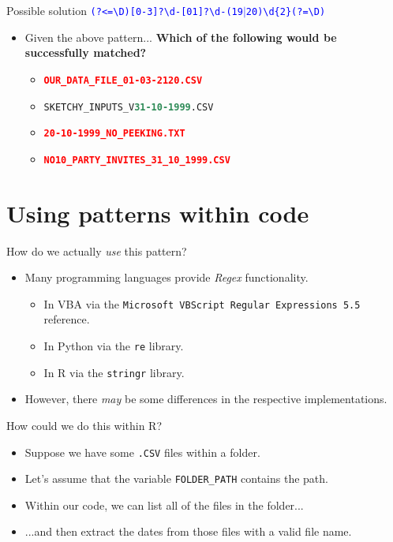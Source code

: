 \documentclass[
	usenames,
	dvipsnames,
] {beamer}
\newcommand{\reDigit}{\textbackslash{}d}
\newcommand{\reNonDigit}{\textbackslash{}D}
\newcommand{\rePattern}[1]{{\Large\texttt{\textcolor{blue}{#1}}}}
\begin{document}
\begin{frame}{Possible solution}
	\rePattern{(?\textless=\reNonDigit)[0-3]?\reDigit-[01]?\reDigit-(19$|$20)\reDigit\{2\}(?=\reNonDigit)}
	\medskip
	
	\begin{itemize}[label=\textbullet]
		\item Given the above pattern... \textbf{Which of the following would be successfully matched?}
		      \begin{itemize}[label=\textendash]
				\item<2-> \texttt{\textbf<3->{\textcolor<3->{red}{OUR\_DATA\_FILE\_01-03-2120.CSV}}}
			      	\item<4-> \texttt{SKETCHY\_INPUTS\_V\textbf<5->{\textcolor<5->{SeaGreen}{31-10-1999}}.CSV}
			      	\item<6-> \texttt{\textbf<7->{\textcolor<7->{red}{20-10-1999\_NO\_PEEKING.TXT}}}
			      	\item<8-> \texttt{\textbf<9->{\textcolor<9->{red}{NO10\_PARTY\_INVITES\_31\_10\_1999.CSV}}}
		      \end{itemize}
	\end{itemize}
\end{frame}

\section{Using patterns within code}
\begin{frame}{How do we actually \emph{use} this pattern?}
	\begin{itemize}[label=\textbullet]
		\item Many programming languages provide \emph{Regex} functionality.
			\pause
		\begin{itemize}[label=\textendash]
			\item In VBA via the \texttt{Microsoft VBScript Regular Expressions 5.5} reference.
				\pause
			\item In Python via the \texttt{re} library.
				\pause
			\item In R via the \texttt{stringr} library.
				\pause
		\end{itemize}			
			
		\item However, there \emph{may} be some differences in the respective implementations.
	\end{itemize}
\end{frame}

\begin{frame}{How could we do this within R?}
	\begin{itemize}[label=\textbullet]
		\item Suppose we have some \texttt{.CSV} files within a folder.
			\pause
		\item Let's assume that the variable \texttt{FOLDER\_PATH} contains the path.
			\pause
		\item Within our code, we can list all of the files in the folder...
			\pause
		\item ...and then extract the dates from those files with a valid file name.
	\end{itemize}
\end{frame}
\end{document}
